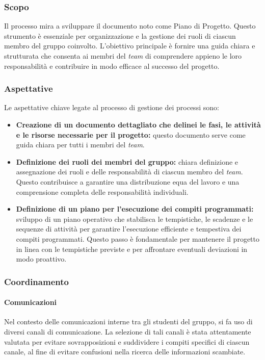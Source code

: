 \documentclass[5pt]{article}
\begin{document}
\subsubsection{Scopo}
Il processo mira a sviluppare il documento noto come Piano di Progetto. Questo strumento è essenziale per organizzazione e la gestione dei ruoli di ciascun membro del gruppo coinvolto. L'obiettivo principale è fornire una guida chiara e strutturata che consenta ai membri del \textit{team} di comprendere appieno le loro responsabilità e contribuire in modo efficace al successo del progetto.

\subsubsection{Aspettative}
Le aspettative chiave legate al processo di gestione dei processi sono:
\begin{itemize}
    \item \textbf{Creazione di un documento dettagliato che delinei le fasi, le attività e le risorse necessarie per il progetto:} questo documento serve come guida chiara per tutti i membri del \textit{team}.
    \item \textbf{Definizione dei ruoli dei membri del gruppo:} chiara definizione e assegnazione dei ruoli e delle responsabilità di ciascun membro del \textit{team}. Questo contribuisce a garantire una distribuzione equa del lavoro e una comprensione completa delle responsabilità individuali.
    \item \textbf{Definizione di un piano per l'esecuzione dei compiti programmati:} sviluppo di un piano operativo che stabilisca le tempistiche, le scadenze e le sequenze di attività per garantire l'esecuzione efficiente e tempestiva dei compiti programmati. Questo passo è fondamentale per mantenere il progetto in linea con le tempistiche previste e per affrontare eventuali deviazioni in modo proattivo.
\end{itemize}

\subsubsection{Coordinamento}
\paragraph{Comunicazioni}
Nel contesto delle comunicazioni interne tra gli studenti del gruppo, si fa uso di diversi canali di comunicazione. La selezione di tali canali è stata attentamente valutata per evitare sovrapposizioni e suddividere i compiti specifici di ciascun canale, al fine di evitare confusioni nella ricerca delle informazioni scambiate.
\end{document}
